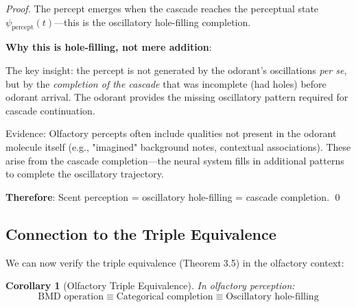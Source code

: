 \documentclass[11pt]{article}
\newtheorem{corollary}[theorem]{Corollary}
\theoremstyle{remark}
\begin{document}
\begin{proof}
The percept emerges when the cascade reaches the perceptual state $\psi_{\text{percept}}(t)$—this is the oscillatory hole-filling completion.

\textbf{Why this is hole-filling, not mere addition}:

The key insight: the percept is not generated by the odorant's oscillations \textit{per se}, but by the \textit{completion of the cascade} that was incomplete (had holes) before odorant arrival. The odorant provides the missing oscillatory pattern required for cascade continuation.

Evidence: Olfactory percepts often include qualities not present in the odorant molecule itself (e.g., "imagined" background notes, contextual associations). These arise from the cascade completion—the neural system fills in additional patterns to complete the oscillatory trajectory.

\textbf{Therefore}: Scent perception = oscillatory hole-filling = cascade completion. \qed
\end{proof}

\subsection{Connection to the Triple Equivalence}

We can now verify the triple equivalence (Theorem 3.5) in the olfactory context:

\begin{corollary}[Olfactory Triple Equivalence]
\label{cor:olfactory_triple}
In olfactory perception:
\begin{equation}
\text{BMD operation} \equiv \text{Categorical completion} \equiv \text{Oscillatory hole-filling}
\end{equation}
\end{corollary}
\end{document}
